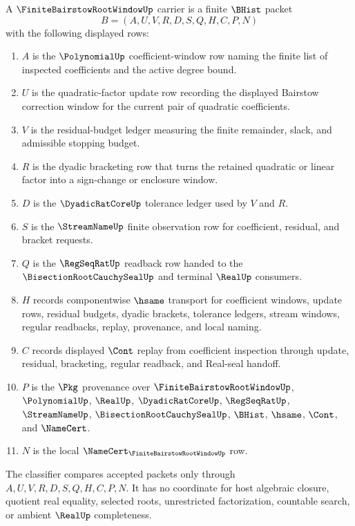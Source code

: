 \begin{definition}
\label{def:finite-bairstow-root-window-carrier}
A $\FiniteBairstowRootWindowUp$ carrier is a finite $\BHist$ packet
$$
B=(A,U,V,R,D,S,Q,H,C,P,N)
$$
with the following displayed rows:
\begin{enumerate}
\item $A$ is the $\PolynomialUp$ coefficient-window row naming the finite list of inspected coefficients and the active degree bound.
\item $U$ is the quadratic-factor update row recording the displayed Bairstow correction window for the current pair of quadratic coefficients.
\item $V$ is the residual-budget ledger measuring the finite remainder, slack, and admissible stopping budget.
\item $R$ is the dyadic bracketing row that turns the retained quadratic or linear factor into a sign-change or enclosure window.
\item $D$ is the $\DyadicRatCoreUp$ tolerance ledger used by $V$ and $R$.
\item $S$ is the $\StreamNameUp$ finite observation row for coefficient, residual, and bracket requests.
\item $Q$ is the $\RegSeqRatUp$ readback row handed to the $\BisectionRootCauchySealUp$ and terminal $\RealUp$ consumers.
\item $H$ records componentwise $\hsame$ transport for coefficient windows, update rows, residual budgets, dyadic brackets, tolerance ledgers, stream windows, regular readbacks, replay, provenance, and local naming.
\item $C$ records displayed $\Cont$ replay from coefficient inspection through update, residual, bracketing, regular readback, and Real-seal handoff.
\item $P$ is the $\Pkg$ provenance over $\FiniteBairstowRootWindowUp$, $\PolynomialUp$, $\RealUp$, $\DyadicRatCoreUp$, $\RegSeqRatUp$, $\StreamNameUp$, $\BisectionRootCauchySealUp$, $\BHist$, $\hsame$, $\Cont$, and $\NameCert$.
\item $N$ is the local $\NameCert_{\FiniteBairstowRootWindowUp}$ row.
\end{enumerate}
The classifier compares accepted packets only through $A,U,V,R,D,S,Q,H,C,P,N$. It has no coordinate for host algebraic closure, quotient real equality, selected roots, unrestricted factorization, countable search, or ambient $\RealUp$ completeness.
\end{definition}

